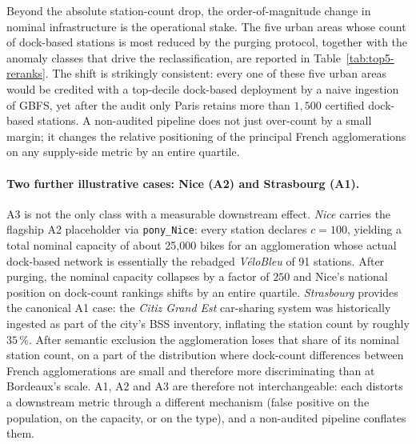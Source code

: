 \documentclass[11pt,a4paper]{article}
\begin{document}

Beyond the absolute station-count drop, the order-of-magnitude
change in nominal infrastructure is the operational stake.
The five urban areas whose count of dock-based stations is most
reduced by the purging protocol, together with the anomaly classes
that drive the reclassification, are reported in
Table~\ref{tab:top5-reranks}. The shift is strikingly consistent:
every one of these five urban areas would be credited with a
top-decile dock-based deployment by a naive ingestion of GBFS,
yet after the audit only Paris retains more than $1{,}500$
certified dock-based stations. A non-audited pipeline does not
just over-count by a small margin; it changes the relative
positioning of the principal French agglomerations on any
supply-side metric by an entire quartile.


\paragraph{Two further illustrative cases: Nice (A2) and Strasbourg (A1).}
A3 is not the only class with a measurable downstream effect.
\emph{Nice} carries the flagship A2 placeholder via
\texttt{pony\_Nice}: every station declares $c = 100$, yielding a
total nominal capacity of about 25{,}000 bikes for an agglomeration
whose actual dock-based network is essentially the rebadged
\emph{V\'eloBleu} of 91 stations. After purging, the nominal
capacity collapses by a factor of $250$ and Nice's national
position on dock-count rankings shifts by an entire quartile.
\emph{Strasbourg} provides the canonical A1 case: the
\emph{Citiz Grand Est} car-sharing system was historically
ingested as part of the city's BSS inventory, inflating the
station count by roughly $35\,\%$. After semantic exclusion the
agglomeration loses that share of its nominal station count, on
a part of the distribution where dock-count differences between
French agglomerations are small and therefore more discriminating
than at Bordeaux's scale. A1, A2 and A3 are therefore not
interchangeable: each distorts a downstream metric through a
different mechanism (false positive on the population, on the
capacity, or on the type), and a non-audited pipeline conflates
them.
\end{document}
